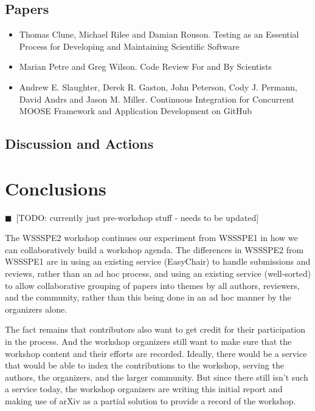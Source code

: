 \documentclass[11pt, oneside]{amsart}
\newcommand{\todo}[1]{{\color{blue}$\blacksquare$~\textsf{[TODO: #1]}}}
\begin{document}
\subsection{Papers}

\begin{itemize}
\item Thomas Clune, Michael Rilee and Damian Rouson. Testing as an Essential Process for Developing and Maintaining Scientific Software~\cite{wssspe2_clune}
\item Marian Petre and Greg Wilson. Code Review For and By Scientists~\cite{wssspe2_petre}
\item Andrew E. Slaughter, Derek R. Gaston, John Peterson, Cody J. Permann, David Andrs and Jason M. Miller. Continuous Integration for Concurrent {MOOSE} Framework and Application Development on {GitHub}~\cite{wssspe2_slaughter}
\end{itemize}

\subsection{Discussion and Actions}


\section{Conclusions}

\todo{currently just pre-workshop stuff - needs to be updated}

The WSSSPE2 workshop continues our experiment from WSSSPE1 in how we can collaboratively build a workshop agenda.  The differences in WSSSPE2 from WSSSPE1 are in using an existing service (EasyChair) to handle submissions and reviews, rather than an ad hoc process, and using an existing service (well-sorted) to allow collaborative grouping of papers into themes by all authors, reviewers, and the community, rather than this being done in an ad hoc manner by the organizers alone.

The fact remains that contributors also want to get credit for their participation in the process.  And the workshop organizers still want to make sure that the workshop content and their efforts are recorded.  Ideally, there would be a service that would be able to index the contributions to the workshop, serving the authors, the organizers, and the larger community.  But since there still isn't such a service today, the workshop organizers are writing this initial report and making use of arXiv as a partial solution to provide a record of the workshop.
\end{document}
